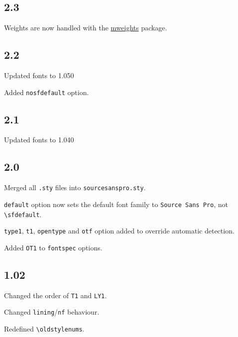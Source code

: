\documentclass[11pt,a4paper,english]{article}
\begin{document}
\begin{multicols}{2}
\subsection*{2.3}
\begin{itemize*}
	\item Weights are now handled with the \href{http://www.ctan.org/pkg/mweights}{mweights} package.
\end{itemize*}

\subsection*{2.2}
\begin{itemize*}
	\item Updated fonts to 1.050
	\item Added \texttt{nosfdefault} option.
\end{itemize*}

\subsection*{2.1}
\begin{itemize*}
	\item Updated fonts to 1.040
\end{itemize*}

\subsection*{2.0}
\begin{itemize*}
	\item Merged all \texttt{.sty} files into \texttt{sourcesanspro.sty}.
	\item \texttt{default} option now sets the default font family to \texttt{Source Sans Pro}, not \texttt{\textbackslash sfdefault}.
	\item \texttt{type1}, \texttt{t1}, \texttt{opentype} and \texttt{otf} option added to override automatic detection.
	\item Added \texttt{OT1} to \texttt{fontspec} options.
\end{itemize*}

\subsection*{1.02}
\begin{itemize*}
	\item Changed the order of \texttt{T1} and \texttt{LY1}.
	\item Changed \texttt{lining}/\texttt{nf} behaviour.
	\item Redefined \texttt{\textbackslash oldstylenums}.
\end{itemize*}


\end{multicols}
\end{document}
